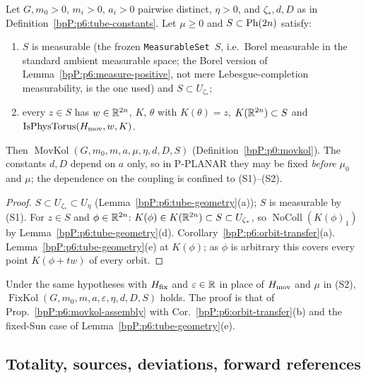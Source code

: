 \begin{proposition}\label{bpP:p6:movkol-assembly}
Let $G,m_0>0$, $m_i>0$, $a_i>0$ pairwise distinct, $\eta>0$, and $\zeta_*,d,D$ as in Definition~\ref{bpP:p6:tube-constants}. Let $\mu\ge0$ and $S\subset\mathrm{Ph}(2n)$ satisfy:
\begin{enumerate}[label=(S\arabic*)]
\item $S$ is measurable (the frozen \texttt{MeasurableSet}~$S$, i.e.\ Borel measurable in the standard ambient measurable space; the Borel version of Lemma~\ref{bpP:p6:measure-positive}, not mere Lebesgue-completion measurability, is the one used) and $S\subset U_{\zeta_*}$;
\item every $z\in S$ has $w\in\mathbb{R}^{2n}$, $K$, $\theta$ with $K(\theta)=z$, $K(\mathbb{R}^{2n})\subset S$ and $\operatorname{IsPhysTorus}(H_{\rm mov},w,K)$.
\end{enumerate}
Then $\operatorname{MovKol}(G,m_0,m,a,\mu,\eta,d,D,S)$ (Definition~\ref{bpP:p0:movkol}). The constants $d,D$ depend on $a$ only, so in P-PLANAR they may be fixed \emph{before} $\mu_0$ and $\mu$; the dependence on the coupling is confined to (S1)--(S2).
\end{proposition}
\begin{proof}
\label{stepP:p6:ma-tube} $S\subset U_{\zeta_*}\subset U_\eta$ (Lemma~\ref{bpP:p6:tube-geometry}(a)); $S$ is measurable by (S1).
\label{stepP:p6:ma-coll} For $z\in S$ and $\phi\in\mathbb{R}^{2n}$: $K(\phi)\in K(\mathbb{R}^{2n})\subset S\subset U_{\zeta_*}$, so $\operatorname{NoColl}(K(\phi)_1)$ by Lemma~\ref{bpP:p6:tube-geometry}(d).
\label{stepP:p6:ma-newton} Corollary~\ref{bpP:p6:orbit-transfer}(a).
\label{stepP:p6:ma-pair} Lemma~\ref{bpP:p6:tube-geometry}(e) at $K(\phi)$; as $\phi$ is arbitrary this covers every point $K(\phi+tw)$ of every orbit.
\end{proof}

\begin{proposition}\label{bpP:p6:fixkol-assembly}
Under the same hypotheses with $H_{\rm fix}$ and $\varepsilon\in\mathbb{R}$ in place of $H_{\rm mov}$ and $\mu$ in (S2), $\operatorname{FixKol}(G,m_0,m,a,\varepsilon,\eta,d,D,S)$ holds. The proof is that of Prop.~\ref{bpP:p6:movkol-assembly} with Cor.~\ref{bpP:p6:orbit-transfer}(b) and the fixed-Sun case of Lemma~\ref{bpP:p6:tube-geometry}(e).
\end{proposition}

\subsection{Totality, sources, deviations, forward references}\label{bpP:p6:notes}

